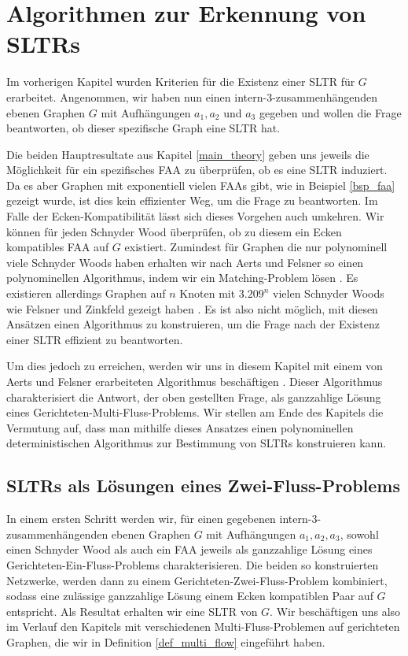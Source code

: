\chapter{Algorithmen zur Erkennung von SLTRs}\label{main_algo}

Im vorherigen Kapitel wurden Kriterien für die Existenz einer SLTR für $G$ erarbeitet. Angenommen, wir haben nun einen intern-3-zusammenhängenden ebenen Graphen $G$ mit Aufhängungen $a_1,a_2$ und $a_3$ gegeben und wollen die Frage beantworten, ob dieser spezifische Graph eine SLTR hat.

Die beiden Hauptresultate aus Kapitel \ref{main_theory} geben uns jeweils die Möglichkeit für ein spezifisches FAA zu überprüfen, ob es eine SLTR induziert. Da es aber Graphen mit exponentiell vielen FAAs gibt, wie in Beispiel \ref{bsp_faa} gezeigt wurde, ist dies kein effizienter Weg, um die Frage zu beantworten. Im Falle der Ecken-Kompatibilität lässt sich dieses Vorgehen auch umkehren. Wir können für jeden Schnyder Wood überprüfen, ob zu diesem ein Ecken kompatibles FAA auf $G$ existiert. Zumindest für Graphen die nur polynominell viele Schnyder Woods haben erhalten wir nach Aerts und Felsner so einen polynominellen Algorithmus, indem wir ein Matching-Problem lösen \cite{af15}. Es existieren allerdings Graphen auf $n$ Knoten mit $3.209^n$ vielen Schnyder Woods wie Felsner und Zinkfeld gezeigt haben \cite{fz08}. Es ist also nicht möglich, mit diesen Ansätzen einen Algorithmus zu konstruieren, um die Frage nach der Existenz einer SLTR effizient zu beantworten.

Um dies jedoch zu erreichen, werden wir uns in diesem Kapitel mit einem von Aerts und Felsner erarbeiteten Algorithmus beschäftigen \cite{af15}. Dieser Algorithmus charakterisiert die Antwort, der oben gestellten Frage, als ganzzahlige Lösung eines Gerichteten-Multi-Fluss-Problems. Wir stellen am Ende des Kapitels die Vermutung auf, dass man mithilfe dieses Ansatzes einen polynominellen deterministischen Algorithmus zur Bestimmung von SLTRs konstruieren kann.

\section{SLTRs als Lösungen eines Zwei-Fluss-Problems}

In einem ersten Schritt werden wir, für einen gegebenen intern-3-zusammenhängenden ebenen Graphen $G$ mit Aufhängungen $a_1,a_2,a_3$, sowohl einen Schnyder Wood als auch ein FAA jeweils als ganzzahlige Lösung eines Gerichteten-Ein-Fluss-Problems charakterisieren. Die beiden so konstruierten Netzwerke, werden dann zu einem Gerichteten-Zwei-Fluss-Problem kombiniert, sodass eine zulässige ganzzahlige Lösung einem Ecken kompatiblen Paar auf $G$ entspricht. Als Resultat erhalten wir eine SLTR von $G$. Wir beschäftigen uns also im Verlauf den Kapitels mit verschiedenen Multi-Fluss-Problemen auf gerichteten Graphen, die wir in Definition \ref{def_multi_flow} eingeführt haben.

